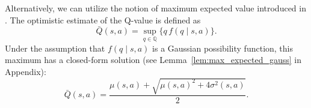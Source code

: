 \documentclass[12pt,a4paper]{report}
\begin{document}
Alternatively, we can utilize the notion of maximum expected value introduced in \cite{thomas2025}. The optimistic estimate of the Q-value is defined as
\[
  \bar{Q}(s,a) = \sup_{q \in \mathbb{Q}} \{ q \, f(q \mid s,a) \}.
\]
Under the assumption that \(f(q \mid s,a)\) is a Gaussian possibility function, this maximum has a closed-form solution (see Lemma~\ref{lem:max_expected_gauss} in Appendix):
\[
  \bar{Q}(s,a) = \frac{\mu(s,a) + \sqrt{\mu(s,a)^2 + 4\sigma^2(s,a)}}{2}.
\]
%
%
%
%
%
%
\end{document}
